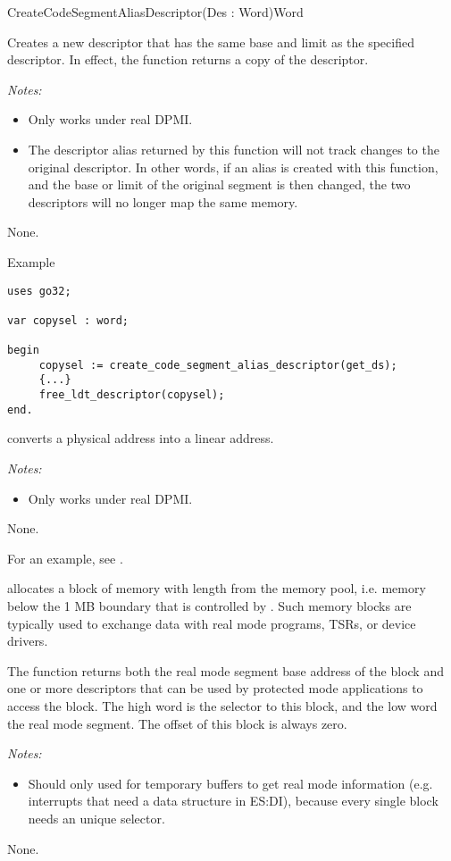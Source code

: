 {CreateCodeSegmentAliasDescriptor}{(Des : Word)}{Word}
{
Creates a new descriptor that has the same base and limit as the
specified descriptor.  In effect, the function returns a copy of the
descriptor.

{\em Notes:}
\begin{itemize}
\item Only works under real DPMI.
\item The descriptor alias returned by this function will not track changes
to the original descriptor. In other words, if an alias is created with
this function, and the base or limit of the original segment is then
changed, the two descriptors will no longer map the same memory.
\end{itemize}
}
{None.}
{}
\begin{FPCList}
\item[Example]
\begin{verbatim}
uses go32;

var copysel : word;

begin
     copysel := create_code_segment_alias_descriptor(get_ds);
     {...}
     free_ldt_descriptor(copysel);
end.
\end{verbatim}
\end{FPCList}

{ converts a physical address  into 
a linear address.

{\em Notes:}
\begin{itemize}
\item Only works under real DPMI.
\end{itemize}
}{None.}{}

For an example, see .

{
allocates a block of memory with length  from the \dos memory pool, 
i.e. memory below the 1 MB boundary that is controlled by \dos. 
Such memory blocks are typically used to exchange data with real mode 
programs, TSRs, or device drivers. 

The function returns both the real mode segment base address of
the block and one or more descriptors that can be used by protected mode
applications to access the block.
The high word is the selector to this block, and the low word the
\dos real mode segment. The offset of this block is always zero.

{\em Notes:}
\begin{itemize}
\item Should only used for temporary buffers to get real mode information
(e.g. interrupts that need a data structure in ES:DI), because every
single block needs an unique selector.
\end{itemize}
}{None.}{}


